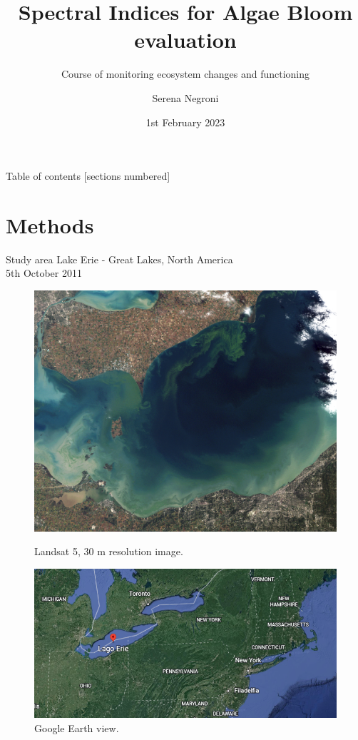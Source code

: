 \documentclass[10pt]{beamer}
\title{Spectral Indices for Algae Bloom evaluation}
\subtitle{Course of monitoring ecosystem changes and functioning}
\date{1st February 2023}
\author{Serena Negroni}
\begin{document}
\maketitle

\begin{frame}{Table of contents}
  [sections numbered]
  \tableofcontents[]
\end{frame}

\section{Methods}

\begin{frame}{Study area}
Lake Erie - Great Lakes, North America \\
5th October 2011
  \begin{figure}
  \begin{minipage}{.53\textwidth}
  \includegraphics[width=.99\textwidth]{images/lakeerie_tm5_2011278_geo.png}
  \caption{Landsat 5, 30 m resolution image.}
  \end{minipage}
  \begin{minipage}[t]{.43\textwidth}
    \includegraphics[width=.99\textwidth]{images/lake_out.png}
   \caption{Google Earth view.}   
  \end{minipage}
\end{figure}  
\end{frame}
\end{document}
